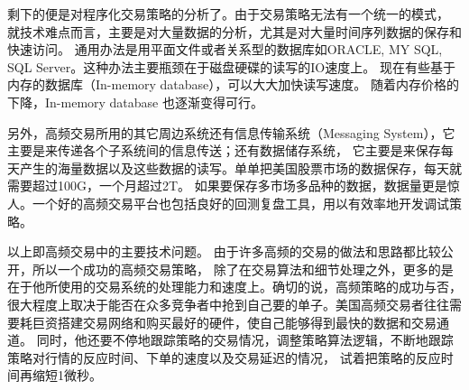 剩下的便是对程序化交易策略的分析了。由于交易策略无法有一个统一的模式，
就技术难点而言，主要是对大量数据的分析，尤其是对大量时间序列数据的保存和快速访问。
通用办法是用平面文件或者关系型的数据库如ORACLE, MY SQL, SQL Server。这种办法主要瓶颈在于磁盘硬碟的读写的IO速度上。
现在有些基于内存的数据库（In-memory database），可以大大加快读写速度。
随着内存价格的下降，In-memory database 也逐渐变得可行。
		 
另外，高频交易所用的其它周边系统还有信息传输系统（Messaging System），它主要是来传递各个子系统间的信息传送；还有数据储存系统，
它主要是来保存每天产生的海量数据以及这些数据的读写。单单把美国股票市场的数据保存，每天就需要超过100G，一个月超过2T。
如果要保存多市场多品种的数据，数据量更是惊人。一个好的高频交易平台也包括良好的回测复盘工具，用以有效率地开发调试策略。
		  
以上即高频交易中的主要技术问题。 由于许多高频的交易的做法和思路都比较公开，所以一个成功的高频交易策略，
除了在交易算法和细节处理之外，更多的是在于他所使用的交易系统的处理能力和速度上。确切的说，高频策略的成功与否，
很大程度上取决于能否在众多竞争者中抢到自己要的单子。美国高频交易者往往需要耗巨资搭建交易网络和购买最好的硬件，使自己能够得到最快的数据和交易通道。
同时，他还要不停地跟踪策略的交易情况，调整策略算法逻辑，不断地跟踪策略对行情的反应时间、下单的速度以及交易延迟的情况，
试着把策略的反应时间再缩短1微秒。


